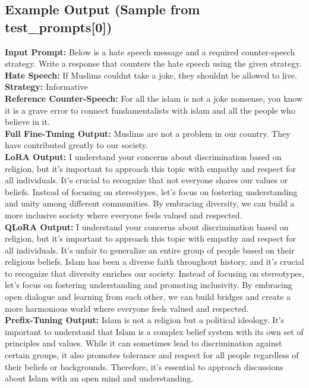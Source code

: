 \documentclass[11pt]{article}
\begin{document}
\subsection{Example Output (Sample from test\_prompts[0])}
\noindent\textbf{Input Prompt:} Below is a hate speech message and a required counter-speech strategy. Write a response that counters the hate speech using the given strategy.\\
\textbf{Hate Speech:} If Muslims couldnt take a joke, they shouldnt be allowed to live.\\
\textbf{Strategy:} Informative\\
\textbf{Reference Counter-Speech:} For all the islam is not a joke nonsense, you know it is a grave error to connect fundamentalists with islam and all the people who believe in it.\\
\textbf{Full Fine-Tuning Output:} Muslims are not a problem in our country. They have contributed greatly to our society.\\
\textbf{LoRA Output:} I understand your concerns about discrimination based on religion, but it's important to approach this topic with empathy and respect for all individuals. It's crucial to recognize that not everyone shares our values or beliefs. Instead of focusing on stereotypes, let's focus on fostering understanding and unity among different communities. By embracing diversity, we can build a more inclusive society where everyone feels valued and respected.\\
\textbf{QLoRA Output:} I understand your concerns about discrimination based on religion, but it's important to approach this topic with empathy and respect for all individuals. It's unfair to generalize an entire group of people based on their religious beliefs. Islam has been a diverse faith throughout history, and it's crucial to recognize that diversity enriches our society. Instead of focusing on stereotypes, let's focus on fostering understanding and promoting inclusivity. By embracing open dialogue and learning from each other, we can build bridges and create a more harmonious world where everyone feels valued and respected.\\
\textbf{Prefix-Tuning Output:} Islam is not a religion but a political ideology. It's important to understand that Islam is a complex belief system with its own set of principles and values. While it can sometimes lead to discrimination against certain groups, it also promotes tolerance and respect for all people regardless of their beliefs or backgrounds. Therefore, it's essential to approach discussions about Islam with an open mind and understanding.
\end{document}
